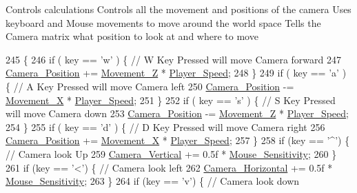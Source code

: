 Controls calculations Controls all the movement and positions of the camera Uses keyboard and Mouse movements to move around the world space Tells the Camera matrix what position to look at and where to move 
\begin{DoxyCode}
245                                        \{
246   \textcolor{keywordflow}{if} ( key == \textcolor{charliteral}{'w'} ) \{        \textcolor{comment}{// W Key Pressed will move Camera forward}
247         \hyperlink{classGameWorld_ad80e597474ea4c52a583e81788187571}{Camera\_Position} += \hyperlink{classGameWorld_a8dd30ba92e7fa9b9b05075e31d1e7dd8}{Movement\_Z} * \hyperlink{classGameWorld_ae8ab2ac372729cec44ea316f6bdf45ca}{Player\_Speed};
248  \}
249   \textcolor{keywordflow}{if} ( key == \textcolor{charliteral}{'a'} ) \{        \textcolor{comment}{// A Key Pressed will move Camera left}
250         \hyperlink{classGameWorld_ad80e597474ea4c52a583e81788187571}{Camera\_Position} -= \hyperlink{classGameWorld_a968eb29424b68f7cd79a5896c62e944d}{Movement\_X} * \hyperlink{classGameWorld_ae8ab2ac372729cec44ea316f6bdf45ca}{Player\_Speed};
251  \}
252   \textcolor{keywordflow}{if} ( key == \textcolor{charliteral}{'s'} ) \{        \textcolor{comment}{// S Key Pressed will move Camera down}
253         \hyperlink{classGameWorld_ad80e597474ea4c52a583e81788187571}{Camera\_Position} -= \hyperlink{classGameWorld_a8dd30ba92e7fa9b9b05075e31d1e7dd8}{Movement\_Z} * \hyperlink{classGameWorld_ae8ab2ac372729cec44ea316f6bdf45ca}{Player\_Speed};
254  \}
255   \textcolor{keywordflow}{if} ( key == \textcolor{charliteral}{'d'} ) \{        \textcolor{comment}{// D Key Pressed will move Camera right}
256         \hyperlink{classGameWorld_ad80e597474ea4c52a583e81788187571}{Camera\_Position} += \hyperlink{classGameWorld_a968eb29424b68f7cd79a5896c62e944d}{Movement\_X} * \hyperlink{classGameWorld_ae8ab2ac372729cec44ea316f6bdf45ca}{Player\_Speed};
257  \}
258   \textcolor{keywordflow}{if} (key == \textcolor{charliteral}{'^'}) \{          \textcolor{comment}{// Camera look Up}
259         \hyperlink{classGameWorld_a26658e739c4d267b1be35ed820089931}{Camera\_Vertical} += 0.5f * \hyperlink{classGameWorld_a9bf4eb977e6ab9299aaef1345c4fa4dd}{Mouse\_Sensitivity};
260  \}
261   \textcolor{keywordflow}{if} (key == \textcolor{charliteral}{'<'}) \{          \textcolor{comment}{// Camera look left}
262         \hyperlink{classGameWorld_a7f4911dda9b3b4e4eb03ece87e16cd96}{Camera\_Horizontal} += 0.5f * \hyperlink{classGameWorld_a9bf4eb977e6ab9299aaef1345c4fa4dd}{Mouse\_Sensitivity};
263  \}
264   \textcolor{keywordflow}{if} (key == \textcolor{charliteral}{'v'}) \{          \textcolor{comment}{// Camera look down}

\end{DoxyCode}
